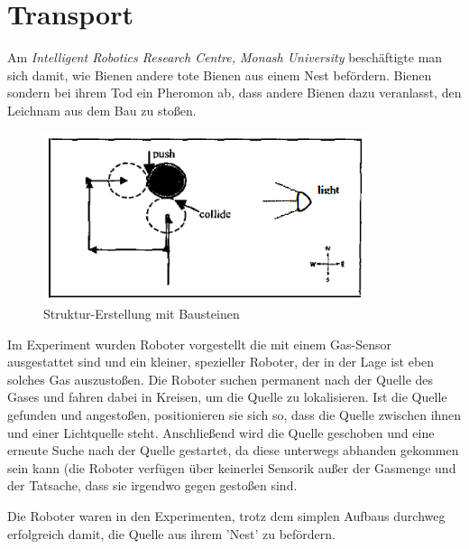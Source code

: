 \section{Transport}

Am \textit{Intelligent Robotics Research Centre, Monash University} beschäftigte man sich damit, wie Bienen andere tote Bienen aus einem Nest befördern. Bienen sondern bei ihrem Tod ein Pheromon ab, dass andere Bienen dazu veranlasst, den Leichnam aus dem Bau zu stoßen.

\begin{figure}
	\includegraphics[width=\pictureWidthBig,keepaspectratio]{graphics/PaperBienen.png}
	\caption{Struktur-Erstellung mit Bausteinen}
	\label{pic:StrukturenKloetze}
\end{figure}

Im Experiment wurden Roboter vorgestellt die mit einem Gas-Sensor ausgestattet sind und ein kleiner, spezieller Roboter, der in der Lage ist eben solches Gas auszustoßen. Die Roboter suchen permanent nach der Quelle des Gases und fahren dabei in Kreisen, um die Quelle zu lokalisieren. Ist die Quelle gefunden und angestoßen, positionieren sie sich so, dass die Quelle zwischen ihnen und einer Lichtquelle steht. Anschließend wird die Quelle geschoben und eine erneute Suche nach der Quelle gestartet, da diese unterwegs abhanden gekommen sein kann (die Roboter verfügen über keinerlei Sensorik außer der Gasmenge und der Tatsache, dass sie irgendwo gegen gestoßen sind.

Die Roboter waren in den Experimenten, trotz dem simplen Aufbaus durchweg erfolgreich damit, die Quelle aus ihrem 'Nest' zu befördern.
\cite{RobotPheromones}
